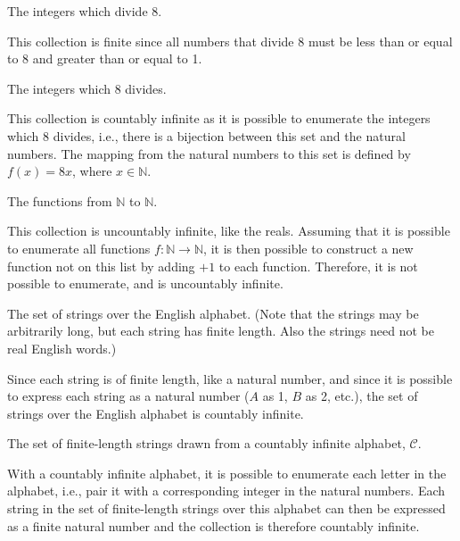 \documentclass[11pt]{article}
\begin{document}
\begin{Parts}

\Part The integers which divide $8$.

\begin{solution}
    This collection is finite since all numbers that divide 8 must be less than 
    or equal to 8 and greater than or equal to 1. 
\end{solution}

\Part The integers which $8$ divides.

\begin{solution}
    This collection is countably infinite as it is possible to enumerate the 
    integers which 8 divides, i.e., there is a bijection between this set and
    the natural numbers. The mapping from the natural numbers to this set is 
    defined by $f(x) = 8x$, where $x \in \mathbb{N}$.
\end{solution}

\Part The functions from $\mathbb{N}$ to $\mathbb{N}$.

\begin{solution}
    This collection is uncountably infinite, like the reals. Assuming that 
    it is possible to enumerate all functions $f: \mathbb{N} \to \mathbb{N}$,
    it is then possible to construct a new function not on this list by adding 
    $+1$ to each function. Therefore, it is not possible to enumerate, and is 
    uncountably infinite. 
\end{solution}

\Part The set of strings over the English alphabet. (Note that the strings may 
be arbitrarily long, but each string has finite length. Also the strings need 
not be real English words.)

\begin{solution}
    Since each string is of finite length, like a natural number, and since it 
    is possible to express each string as a natural number ($A$ as 1, $B$ as 2, 
    etc.), the set of strings over the English alphabet is countably infinite. 
\end{solution}

\Part The set of finite-length strings drawn from a countably infinite alphabet, 
$\mathcal{C}$.

\begin{solution}
    With a countably infinite alphabet, it is possible to enumerate each letter 
    in the alphabet, i.e., pair it with a corresponding integer in the natural 
    numbers. Each string in the set of finite-length strings over this alphabet
    can then be expressed as a finite natural number and the collection is therefore
    countably infinite. 
\end{solution}


\end{Parts}
\end{document}
